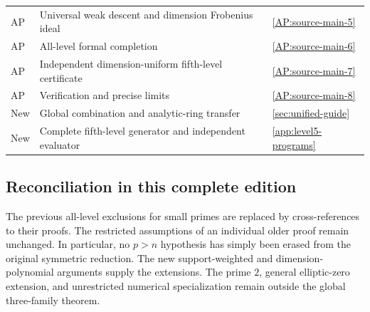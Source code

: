 \documentclass[11pt,a4paper]{article}
\theoremstyle{definition}\newtheorem{definition}[theorem]{Definition}
\theoremstyle{remark}\newtheorem{remark}[theorem]{Remark}
\numberwithin{equation}{section}
\begin{document}
\begin{longtable}{@{}p{}p{}p{}@{}}
AP & Universal weak descent and dimension Frobenius ideal & \ref{AP:source-main-5}\\
AP & All-level formal completion & \ref{AP:source-main-6}\\
AP & Independent dimension-uniform fifth-level certificate & \ref{AP:source-main-7}\\
AP & Verification and precise limits & \ref{AP:source-main-8}\\
New & Global combination and analytic-ring transfer & \ref{sec:unified-guide}\\
New & Complete fifth-level generator and independent evaluator & \ref{app:level5-programs}\\
\bottomrule
\end{longtable}

\subsection{Reconciliation in this complete edition}
The previous all-level exclusions for small primes are replaced by
cross-references to their proofs. The restricted assumptions of an
individual older proof remain unchanged. In particular, no $p>n$
hypothesis has simply been erased from the original symmetric reduction.
The new support-weighted and dimension-polynomial arguments supply
the extensions. The prime $2$, general elliptic-zero extension, and
unrestricted numerical specialization remain outside the global
three-family theorem.
\end{document}
